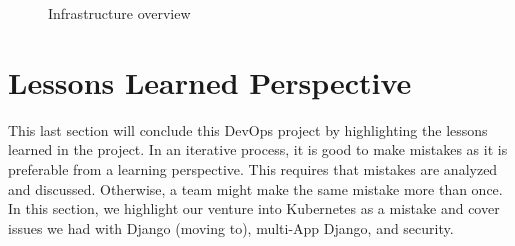\documentclass[11pt]{article}
\begin{document}
\begin{figure}[]
    \centering
    \caption{Infrastructure overview}
    \label{fig:deployment_overview}
\end{figure}

\section{Lessons Learned Perspective}
This last section will conclude this DevOps project by highlighting the lessons learned in the project. In an iterative process, it is good to make mistakes as it is preferable from a learning perspective. This requires that mistakes are analyzed and discussed. Otherwise, a team might make the same mistake more than once. In this section, we highlight our venture into Kubernetes as a mistake and cover issues we had with Django (moving to), multi-App Django, and security.
\end{document}
